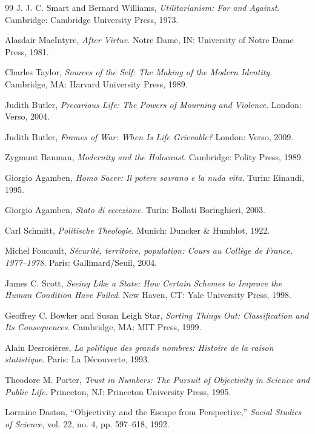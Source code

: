\documentclass[11pt,oneside]{book}
\theoremstyle{definition}
\theoremstyle{remark}
\begin{document}
\begin{thebibliography}{99}
 J. J. C. Smart and Bernard Williams, \emph{Utilitarianism: For and Against}. Cambridge:
  Cambridge University Press, 1973.

 Alasdair MacIntyre, \emph{After Virtue}. Notre Dame, IN: University of Notre Dame Press, 1981.

 Charles Taylor, \emph{Sources of the Self: The Making of the Modern Identity}. Cambridge, MA:
  Harvard University Press, 1989.

 Judith Butler, \emph{Precarious Life: The Powers of Mourning and Violence}. London: Verso, 2004.

 Judith Butler, \emph{Frames of War: When Is Life Grievable?} London: Verso, 2009.

 Zygmunt Bauman, \emph{Modernity and the Holocaust}. Cambridge: Polity Press, 1989.

 Giorgio Agamben, \emph{Homo Sacer: Il potere sovrano e la nuda vita}. Turin: Einaudi, 1995.

 Giorgio Agamben, \emph{Stato di eccezione}. Turin: Bollati Boringhieri, 2003.

 Carl Schmitt, \emph{Politische Theologie}. Munich: Duncker \& Humblot, 1922.

 Michel Foucault, \emph{S\'ecurit\'e, territoire, population: Cours au Coll\`ege de France,
  1977--1978}. Paris: Gallimard/Seuil, 2004.

 James C. Scott, \emph{Seeing Like a State: How Certain Schemes to Improve the Human Condition
  Have Failed}. New Haven, CT: Yale University Press, 1998.

 Geoffrey C. Bowker and Susan Leigh Star, \emph{Sorting Things Out: Classification and Its
  Consequences}. Cambridge, MA: MIT Press, 1999.

 Alain Desrosi\`eres, \emph{La politique des grands nombres: Histoire de la raison statistique}.
  Paris: La D\'ecouverte, 1993.

 Theodore M. Porter, \emph{Trust in Numbers: The Pursuit of Objectivity in Science and Public
  Life}. Princeton, NJ: Princeton University Press, 1995.

 Lorraine Daston, ``Objectivity and the Escape from Perspective,'' \emph{Social Studies of
  Science}, vol. 22, no. 4, pp. 597--618, 1992.


\end{thebibliography}
\end{document}
